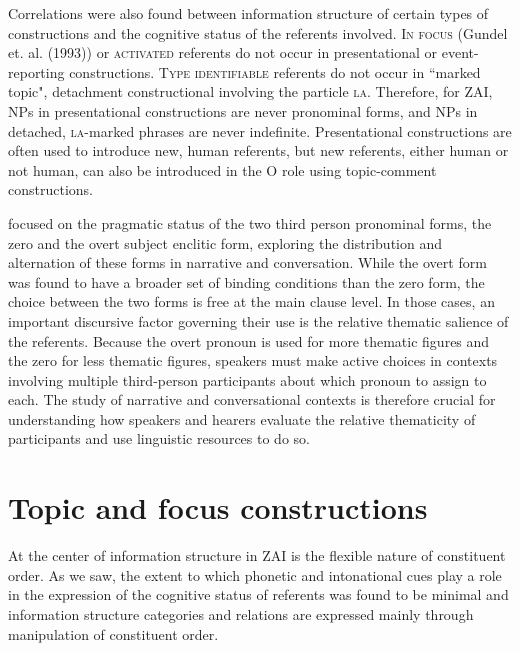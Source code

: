 Correlations were also found between information structure of certain types of constructions and the cognitive status of the referents involved. \textsc{In focus} (Gundel et. al. (1993)) or \textsc{activated} referents do not occur in presentational or event-reporting constructions. \textsc{Type identifiable} referents do not occur in ``marked topic", detachment constructional involving the particle \textsc{la}. Therefore, for ZAI, NPs in presentational constructions are never pronominal forms, and NPs in detached, \textsc{la}-marked phrases are never indefinite. Presentational constructions are often used to introduce new, human referents, but new referents, either human or not human, can also be introduced in the O role using topic-comment constructions.

 focused on the pragmatic status of the two third person pronominal forms, the zero and the overt subject enclitic form, exploring the distribution and alternation of these forms in narrative and conversation. While the overt form was found to have a broader set of binding conditions than the zero form, the choice between the two forms is free at the main clause level. In those cases, an important discursive factor governing their use is the relative thematic salience of the referents. Because the overt pronoun is used for more thematic figures and the zero for less thematic figures, speakers must make active choices in contexts involving multiple third-person participants about which pronoun to assign to each. The study of narrative and conversational contexts is therefore crucial for understanding how speakers and hearers evaluate the relative thematicity of participants and use linguistic resources to do so.



\section{Topic and focus constructions}

At the center of information structure in ZAI is the flexible nature of constituent order. As we saw, the extent to which phonetic and intonational cues play a role in the expression of the cognitive status of referents was found to be minimal and information structure categories and relations are expressed mainly through manipulation of constituent order. 

